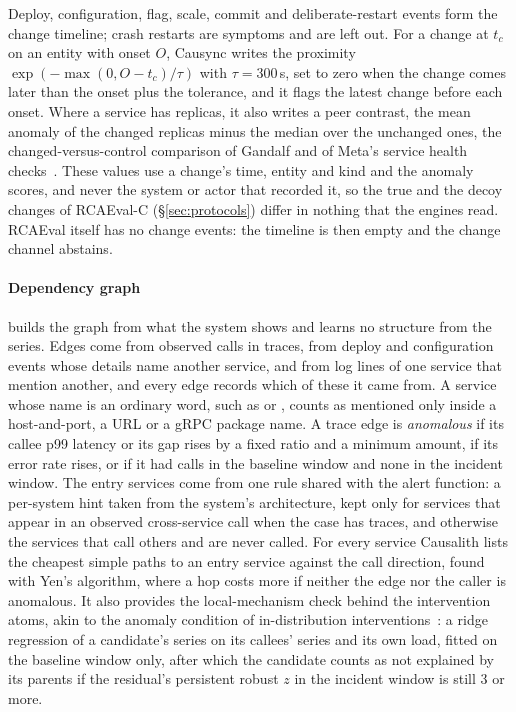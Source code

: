 Deploy, configuration, flag, scale, commit and deliberate-restart events form the change timeline; crash restarts are symptoms and are left out.
For a change at $t_c$ on an entity with onset $O$, Causync writes the proximity $\exp(-\max(0, O - t_c)/\tau)$ with $\tau = 300$\,s, set to zero when the change comes later than the onset plus the tolerance, and it flags the latest change before each onset.
Where a service has replicas, it also writes a peer contrast, the mean anomaly of the changed replicas minus the median over the unchanged ones, the changed-versus-control comparison of Gandalf and of Meta's service health checks~\cite{gandalf2020,metahealth2026}.
These values use a change's time, entity and kind and the anomaly scores, and never the system or actor that recorded it, so the true and the decoy changes of RCAEval-C (\S\ref{sec:protocols}) differ in nothing that the engines read.
RCAEval itself has no change events: the timeline is then empty and the change channel abstains.

\paragraph{Dependency graph}
 builds the graph from what the system shows and learns no structure from the series.
Edges come from observed calls in traces, from deploy and configuration events whose details name another service, and from log lines of one service that mention another, and every edge records which of these it came from.
A service whose name is an ordinary word, such as  or , counts as mentioned only inside a host-and-port, a URL or a gRPC package name.
A trace edge is \emph{anomalous} if its callee p99 latency or its gap rises by a fixed ratio and a minimum amount, if its error rate rises, or if it had calls in the baseline window and none in the incident window.
The entry services come from one rule shared with the alert function: a per-system hint taken from the system's architecture, kept only for services that appear in an observed cross-service call when the case has traces, and otherwise the services that call others and are never called.
For every service Causalith lists the cheapest simple paths to an entry service against the call direction, found with Yen's algorithm, where a hop costs more if neither the edge nor the caller is anomalous.
It also provides the local-mechanism check behind the intervention atoms, akin to the anomaly condition of in-distribution interventions~\cite{idi2025}: a ridge regression of a candidate's series on its callees' series and its own load, fitted on the baseline window only, after which the candidate counts as not explained by its parents if the residual's persistent robust $z$ in the incident window is still 3 or more.
